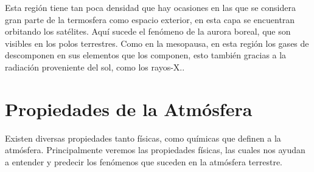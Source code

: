\documentclass[12pt]{article}
\begin{document}
    Esta región tiene tan poca densidad que hay ocasiones en las que se considera gran parte de la termosfera como espacio exterior, en esta capa se encuentran orbitando los satélites. Aquí sucede el fenómeno de la aurora boreal, que son visibles en los polos terrestres.
    Como en la mesopausa, en esta región los gases de descomponen en sus elementos que los componen, esto también gracias a la radiación proveniente del sol, como los rayos-X.\cite{termo}.
    
\newpage
\section{Propiedades de la Atmósfera}
Existen diversas propiedades tanto físicas, como químicas que definen a la atmósfera. Principalmente veremos las propiedades físicas, las cuales nos ayudan a entender y predecir los fenómenos que suceden en la atmósfera terrestre.
\end{document}
